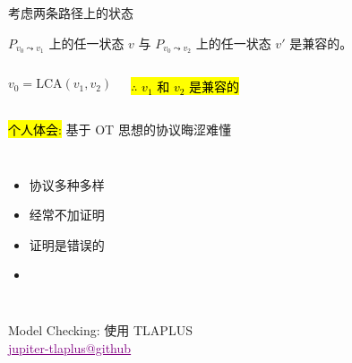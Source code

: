 \begin{frame}{}
  \centerline{ 考虑两条路径上的状态}

  \begin{clemma}
    $P_{v_0 \leadsto v_1}$ 上的任一状态 $v$ 与 $P_{v_0 \leadsto v_2}$ 上的任一状态 $v'$ 是兼容的。
  \end{clemma}

  \begin{columns}
	\[
	  v_0 = \text{LCA}(v_1, v_2)
	\]

	\pause
	\vspace{0.50cm}
	\begin{center}
	  \hl{$\therefore$ $v_1$ 和 $v_2$ 是兼容的}
	\end{center}
  \end{columns}
\end{frame}

\begin{frame}{}
  \centerline{\large \hl{个人体会:} 基于 OT 思想的协议晦涩难懂}

  \vspace{0.60cm}
  \begin{columns}
      \pause
      \begin{itemize}
	\setlength{\itemsep}{10pt}
	\centering
	\item 协议多种多样
	\item 经常不加证明
	\item 证明是错误的
	\item<3-> \hl{}
      \end{itemize}
  \end{columns}
\end{frame}

\begin{frame}{}
  \begin{center}
    {\large 
      Model Checking: 使用 TLAPLUS \\[5pt]
      \href{https://github.com/Disalg-ICS-NJU/tlaplus-lamport-projects/tree/master/tlaplus-projects/Hengfeng-Wei/Wei-jupiter-tla}{\textcolor{purple}{\underline{jupiter-tlaplus@github}}}
    }
  \end{center}

  \begin{columns}
      \vspace{-0.50cm}
    \pause
  \end{columns}
\end{frame}
